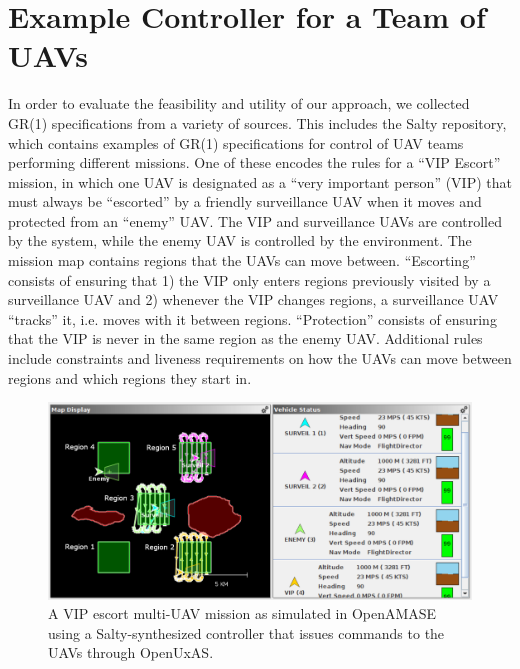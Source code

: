 \documentclass[runningheads]{llncs}
\begin{document}
\section{Example Controller for a Team of UAVs}
\label{sec:vipExample}

In order to evaluate the feasibility and utility of our approach, we collected GR(1) specifications from a variety of sources. 
This includes the Salty repository, which contains examples of GR(1) specifications for control of UAV teams performing different missions. 
One of these encodes the rules for a ``VIP Escort'' mission, 
in which one UAV is designated as a ``very important person'' (VIP) that must always be ``escorted'' by a friendly surveillance UAV when it moves
and protected from an ``enemy'' UAV. 
The VIP and surveillance UAVs are controlled by the system, while the enemy UAV is controlled by the environment.
The mission map contains regions that the UAVs can move between.  
``Escorting'' consists of ensuring that 1) the VIP only enters regions previously visited by a surveillance UAV 
and 2) whenever the VIP changes regions, a surveillance UAV ``tracks'' it, i.e. moves with it between regions. 
``Protection'' consists of ensuring that the VIP is never in the same region as the enemy UAV. 
Additional rules include constraints and liveness requirements on how the UAVs can move between regions and which regions they start in. 

\begin{figure}
  \includegraphics[width=\textwidth]{smallMission}
  \caption{A VIP escort multi-UAV mission as simulated in OpenAMASE using a Salty-synthesized controller that issues commands to the UAVs through OpenUxAS.}
  \label{fig:vipEscort}
\end{figure}
\end{document}
